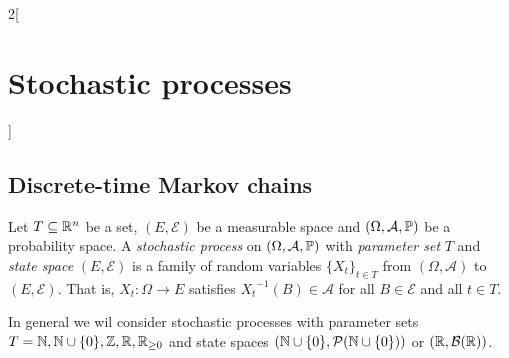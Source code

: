 \documentclass[../../../main_math.tex]{subfiles}
\begin{document}
\begin{multicols}{2}[\section{Stochastic processes}]
  \subsection{Discrete-time Markov chains}
  \begin{definition}
    Let $T\subseteq \mathbb{R}^n$ be a set, $(E,\mathcal{E})$ be a measurable space and $(\Omega,\mathcal{A},\mathbb{P})$ be a probability space. A \emph{stochastic process} on $(\Omega,\mathcal{A},\mathbb{P})$ with \emph{parameter set} $T$ and \emph{state space} $(E,\mathcal{E})$ is a family of random variables ${\{X_t\}}_{t\in T}$ from $(\Omega,\mathcal{A})$ to $(E,\mathcal{E})$. That is, $X_t:\Omega\to E$ satisfies ${X_t}^{-1}(B)\in\mathcal{A}$ for all $B\in\mathcal{E}$ and all $t\in T$.
  \end{definition}
  \begin{remark}
    In general we wil consider stochastic processes with parameter sets $T=\mathbb{N},\mathbb{N}\cup\{0\},\mathbb{Z},\mathbb{R},\mathbb{R}_{\geq 0}$ and state spaces $(\mathbb{N}\cup\{0\},\mathcal{P}(\mathbb{N} \cup \{0\}))$ or $(\mathbb{R},\mathcal{B}(\mathbb{R}))$.
  \end{remark}

\end{multicols}
\end{document}
